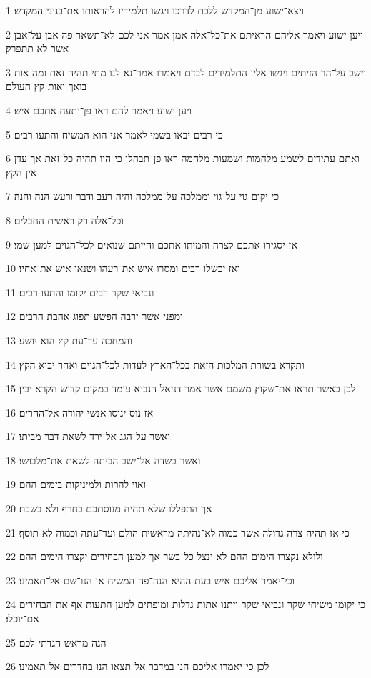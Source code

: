 \par 1 ויצא־ישוע מן־המקדש ללכת לדרכו ויגשו תלמידיו להראותו את־בניני המקדש׃
\par 2 ויען ישוע ויאמר אליהם הראיתם את־כל־אלה אמן אמר אני לכם לא־תשאר פה אבן על־אבן אשר לא תתפרק׃
\par 3 וישב על־הר הזיתים ויגשו אליו התלמידים לבדם ויאמרו אמר־נא לנו מתי תהיה זאת ומה אות בואך ואות קץ העולם׃
\par 4 ויען ישוע ויאמר להם ראו פן־יתעה אתכם איש׃
\par 5 כי רבים יבאו בשמי לאמר אני הוא המשיח והתעו רבים׃
\par 6 ואתם עתידים לשמע מלחמות ושמעות מלחמה ראו פן־תבהלו כי־היו תהיה כל־זאת אך עדן אין הקץ׃
\par 7 כי יקום גוי על־גוי וממלכה על־ממלכה והיה רעב ודבר ורעש הנה והנה׃
\par 8 וכל־אלה רק ראשית החבלים׃
\par 9 אז יסגירו אתכם לצרה והמיתו אתכם והייתם שנואים לכל־הגוים למען שמי׃
\par 10 ואז יכשלו רבים ומסרו איש את־רעהו ושנאו איש את־אחיו׃
\par 11 ונביאי שקר רבים יקומו והתעו רבים׃
\par 12 ומפני אשר ירבה הפשע תפוג אהבת הרבים׃
\par 13 והמחכה עד־עת קץ הוא יושע׃
\par 14 ותקרא בשורת המלכות הזאת בכל־הארץ לעדות לכל־הגוים ואחר יבוא הקץ׃
\par 15 לכן כאשר תראו את־שקוץ משמם אשר אמר דניאל הנביא עומד במקום קדוש הקרא יבין׃
\par 16 אז נוס ינוסו אנשי יהודה אל־ההרים׃
\par 17 ואשר על־הגג אל־ירד לשאת דבר מביתו׃
\par 18 ואשר בשדה אל־ישב הביתה לשאת את־מלבושו׃
\par 19 ואוי להרות ולמיניקות בימים ההם׃
\par 20 אך התפללו שלא תהיה מנוסתכם בחרף ולא בשבת׃
\par 21 כי אז תהיה צרה גדולה אשר כמוה לא־נהיתה מראשית הולם ועד־עתה וכמוה לא תוסף׃
\par 22 ולולא נקצרו הימים ההם לא ינצל כל־בשר אך למען הבחירים יקצרו הימים ההם׃
\par 23 וכי־יאמר אליכם איש בעת ההיא הנה־פה המשיח או הנו־שם אל־תאמינו׃
\par 24 כי יקומו משיחי שקר ונביאי שקר ויתנו אתות גדלות ומופתים למען התעות אף את־הבחירים אם־יוכלו׃
\par 25 הנה מראש הגדתי לכם׃
\par 26 לכן כי־יאמרו אליכם הנו במדבר אל־תצאו הנו בחדרים אל־תאמינו׃
